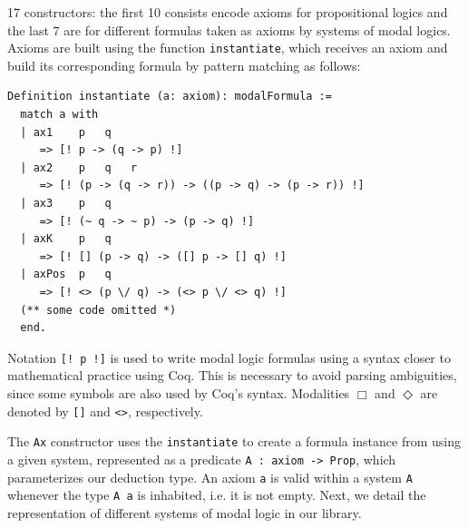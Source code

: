 \documentclass[sigconf]{acmart}
\begin{document}
17 constructors: the first 10 consists encode axioms for propositional logics
and the last 7 are for different formulas taken as axioms by systems of modal logics.
Axioms are built using the function \texttt{instantiate}, which
receives an axiom and build its corresponding formula by pattern matching as
follows:
\begin{verbatim}
Definition instantiate (a: axiom): modalFormula :=
  match a with
  | ax1    p   q
     => [! p -> (q -> p) !]
  | ax2    p   q   r
     => [! (p -> (q -> r)) -> ((p -> q) -> (p -> r)) !]
  | ax3    p   q
     => [! (~ q -> ~ p) -> (p -> q) !]
  | axK    p   q
     => [! [] (p -> q) -> ([] p -> [] q) !]
  | axPos  p   q
     => [! <> (p \/ q) -> (<> p \/ <> q) !]
  (** some code omitted *)
  end.
\end{verbatim}
Notation \texttt{[! p !]} is used to write modal logic formulas using a
syntax closer to mathematical practice using Coq. This is necessary to avoid
parsing ambiguities, since some symbols are also used by Coq's syntax.
Modalities $\Box$ and $\Diamond$ are denoted by \texttt{[]}
and \texttt{<>}, respectively.

The \texttt{Ax} constructor uses the \texttt{instantiate} to
create a formula instance from using a given system, represented as a predicate
\texttt{A : axiom -> Prop}, which parameterizes our deduction type. An
axiom \texttt{a} is valid within a system \texttt{A} whenever
the type \texttt{A a} is inhabited, i.e. it is not empty. Next, we
detail the representation of different systems of modal logic in our library.
\end{document}
